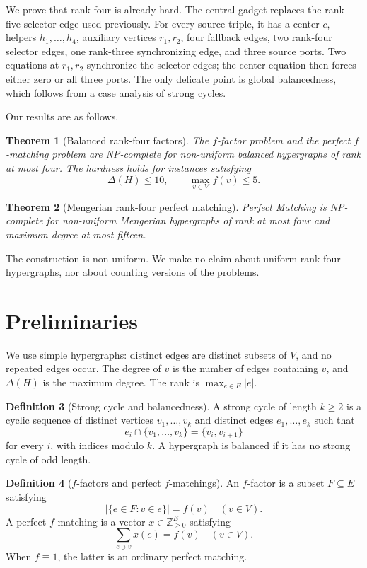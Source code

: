\documentclass[11pt]{article}
\newtheorem{theorem}{Theorem}[section]
\theoremstyle{definition}
\newtheorem{definition}[theorem]{Definition}
\theoremstyle{remark}
\newcommand{\Z}{\mathbb Z}
\begin{document}
We prove that rank four is already hard. The central gadget replaces the
rank-five selector edge used previously. For every source triple, it has a
center $c$, helpers $h_1,\ldots,h_4$, auxiliary vertices $r_1,r_2$, four
fallback edges, two rank-four selector edges, one rank-three synchronizing
edge, and three source ports. Two equations at $r_1,r_2$ synchronize the
selector edges; the center equation then forces either zero or all three
ports. The only delicate point is global balancedness, which follows from a
case analysis of strong cycles.

Our results are as follows.

\begin{theorem}[Balanced rank-four factors]
\label{thm:balanced}
The $f$-factor problem and the perfect $f$-matching problem are
NP-complete for non-uniform balanced hypergraphs of rank at most four. The
hardness holds for instances satisfying
\[
\Delta(H)\le10,\qquad \max_{v\in V}f(v)\le5.
\]
\end{theorem}

\begin{theorem}[Mengerian rank-four perfect matching]
\label{thm:mengerian}
Perfect Matching is NP-complete for non-uniform Mengerian hypergraphs of
rank at most four and maximum degree at most fifteen.
\end{theorem}

The construction is non-uniform. We make no claim about uniform rank-four
hypergraphs, nor about counting versions of the problems.

\section{Preliminaries}

We use simple hypergraphs: distinct edges are distinct subsets of $V$, and
no repeated edges occur. The degree of $v$ is the number of edges containing
$v$, and $\Delta(H)$ is the maximum degree. The rank is
$\max_{e\in E}|e|$.

\begin{definition}[Strong cycle and balancedness]
A strong cycle of length $k\ge2$ is a cyclic sequence of distinct vertices
$v_1,\ldots,v_k$ and distinct edges $e_1,\ldots,e_k$ such that
\[
e_i\cap\{v_1,\ldots,v_k\}=\{v_i,v_{i+1}\}
\]
for every $i$, with indices modulo $k$. A hypergraph is balanced if it has
no strong cycle of odd length.
\end{definition}

\begin{definition}[$f$-factors and perfect $f$-matchings]
An $f$-factor is a subset $F\subseteq E$ satisfying
\[
|\{e\in F:v\in e\}|=f(v)\quad(v\in V).
\]
A perfect $f$-matching is a vector $x\in\Z_{\ge0}^{E}$ satisfying
\[
\sum_{e\ni v}x(e)=f(v)\quad(v\in V).
\]
When $f\equiv1$, the latter is an ordinary perfect matching.
\end{definition}
\end{document}
